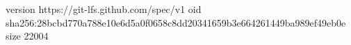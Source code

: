 version https://git-lfs.github.com/spec/v1
oid sha256:28bcbd770a788e10e6d5a0f0658c8dd20341659b3e664261449ba989ef49eb0e
size 22004
